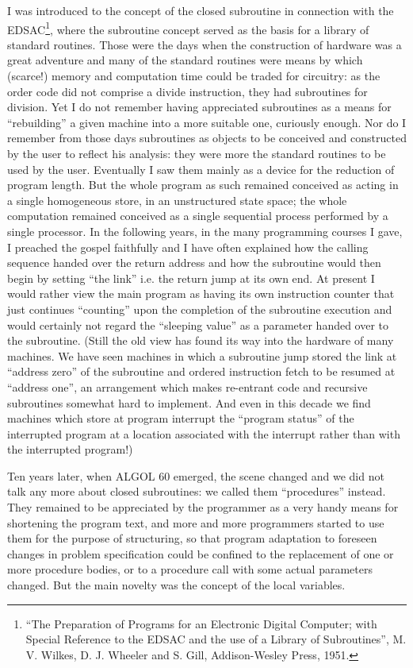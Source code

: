 I was introduced to the concept of the closed subroutine in connection with the EDSAC\footnote{``The Preparation of Programs for an Electronic Digital Computer; with Special Reference to the EDSAC and the use of a Library of Subroutines'', M. V. Wilkes, D. J. Wheeler and S. Gill, Addison-Wesley Press, 1951.}, where the subroutine concept served as the basis for a library of standard routines. Those were the days when the construction of hardware was a great adventure and many of the standard routines were means by which (scarce!) memory and computation time could be traded for circuitry: as the order code did not comprise a divide instruction, they had subroutines for division. Yet I do not remember having appreciated subroutines as a means for ``rebuilding'' a given machine into a more suitable one, curiously enough. Nor do I remember from those days subroutines as objects to be conceived and constructed by the user to reflect his analysis: they were more the standard routines to be used by the user. Eventually I saw them mainly as a device for the reduction of program length. But the whole program as such remained conceived as acting in a single homogeneous store, in an unstructured state space; the whole computation remained conceived as a single sequential process performed by a single processor. In the following years, in the many programming courses I gave, I preached the gospel faithfully and I have often explained how the calling sequence handed over the return address and how the subroutine would then begin by setting ``the link'' \textemdash{}  i.e. the return jump \textemdash{}  at its own end. At present I would rather view the main program as having its own instruction counter that just continues ``counting'' upon the completion of the subroutine execution and would certainly not regard the ``sleeping value'' as a parameter handed over to the subroutine. (Still the old view has found its way into the hardware of many machines. We have seen machines in which a subroutine jump stored the link at ``address zero'' of the subroutine and ordered instruction fetch to be resumed at ``address one'', an arrangement which makes re-entrant code and recursive subroutines somewhat hard to implement. And even in this decade we find machines which store at program interrupt the ``program status'' of the interrupted program at a location associated with the interrupt rather than with the interrupted program!)

Ten years later, when ALGOL 60 emerged, the scene changed and we did not talk any more about closed subroutines: we called them ``procedures'' instead. They remained to be appreciated by the programmer as a very handy means for shortening the program text, and more and more programmers started to use them for the purpose of structuring, so that program adaptation to foreseen changes in problem specification could be confined to the replacement of one or more procedure bodies, or to a procedure call with some actual parameters changed. But the main novelty was the concept of the local variables.

